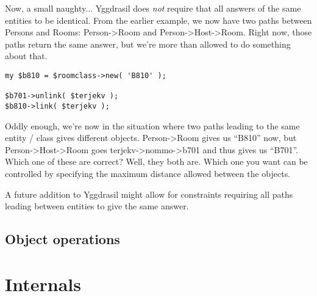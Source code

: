 \documentclass[english,a4paper]{article}
\begin{document}
Now, a small naughty...  Yggdrasil does \textit{not} require that all
answers of the same entities to be identical.  From the earlier
example, we now have two paths between Persons and Rooms: Person->Room
and Person->Host->Room.  Right now, those paths return the same
answer, but we're more than allowed to do something about that.

\lstset{caption=Two paths giving different answers,label=funpaths}
\begin{lstlisting}
my $b810 = $roomclass->new( 'B810' );

$b701->unlink( $terjekv );
$b810->link( $terjekv );
\end{lstlisting}

Oddly enough, we're now in the situation where two paths leading to
the same entity / class gives different objects.  Person->Room gives
us ``B810'' now, but Person->Host->Room goes terjekv->nommo->b701 and
thus gives us ``B701''.  Which one of these are correct?  Well, they
both are.  Which one you want can be controlled by specifying the
maximum distance allowed between the objects.   

A future addition to Yggdrasil might allow for constraints requiring
all paths leading between entities to give the same answer.  

\subsection{Object operations}

\newpage
\section{Internals}
\end{document}
